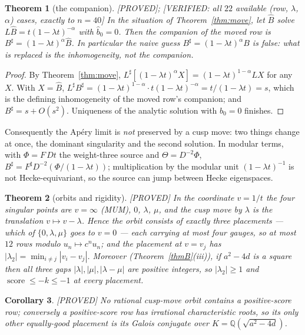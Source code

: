 \documentclass[11pt,reqno]{amsart}
\theoremstyle{plain}
\newtheorem{theorem}{Theorem}[section]
\newtheorem{corollary}[theorem]{Corollary}
\theoremstyle{definition}
\theoremstyle{remark}
\theoremstyle{plain}
\newcommand{\Q}{\mathbb{Q}}
\newcommand{\Proved}{\textup{\textsf{[PROVED]}}}
\newcommand{\VerifiedR}[1]{\textup{\textsf{[VERIFIED: #1]}}}
\begin{document}
\begin{theorem}[the companion]\label{thm:companion}
\Proved{}; \VerifiedR{all $22$ available (row, $\lambda$, $\alpha$) cases, exactly
to $n=40$} In the situation of Theorem~\ref{thm:move}, let $\widehat B$ solve
$L\widehat B=t(1-\lambda t)^{-\alpha}$ with $\widehat b_0=0$. Then the companion
of the moved row is $B^{\sharp}=(1-\lambda t)^{\alpha}\widehat B$. In particular
the naive guess $B^{\sharp}=(1-\lambda t)^{\alpha}B$ is \emph{false}: what is
replaced is the inhomogeneity, not the companion.
\end{theorem}

\begin{proof}
By Theorem~\ref{thm:move}, $L^{\sharp}[(1-\lambda t)^{\alpha}X]
=(1-\lambda t)^{1-\alpha}LX$ for any $X$. With $X=\widehat B$,
$L^{\sharp}B^{\sharp}=(1-\lambda t)^{1-\alpha}\cdot t(1-\lambda t)^{-\alpha}
=t/(1-\lambda t)=s$, which is the defining inhomogeneity of the moved row's
companion; and $B^\sharp=s+O(s^2)$. Uniqueness of the analytic solution with
$b_0=0$ finishes.
\end{proof}

Consequently the Ap\'ery limit is \emph{not} preserved by a cusp move: two
things change at once, the dominant singularity and the second solution. In
modular terms, with $\Phi=F\,Dt$ the weight-three source and
$\Theta=D^{-2}\Phi$, $B^\sharp=F^\sharp D^{-2}(\Phi/(1-\lambda t))$;
multiplication by the modular unit $(1-\lambda t)^{-1}$ is not Hecke-equivariant,
so the source can jump between Hecke eigenspaces.

\begin{theorem}[orbits and rigidity]\label{thm:orbits}
\Proved{} In the coordinate $v=1/t$ the four singular points are $v=\infty$
\textup{(}MUM\textup{)}, $0$, $\lambda$, $\mu$, and the cusp move by $\lambda$ is
the translation $v\mapsto v-\lambda$. Hence the orbit consists of exactly three
\emph{placements} --- which of $\{0,\lambda,\mu\}$ goes to $v=0$ --- each carrying
at most four gauges, so at most $12$ rows modulo $u_n\mapsto c^nu_n$; and the
placement at $v=v_j$ has $|\lambda_2|=\min_{i\ne j}|v_i-v_j|$. Moreover
\textup{(}Theorem~\ref{thmB}(iii)\textup{)}, if $a^2-4d$ is a square then all
three gaps $|\lambda|,|\mu|,|\lambda-\mu|$ are positive integers, so
$|\lambda_2|\ge1$ and $\operatorname{score}\le-k\le-1$ at every placement.
\end{theorem}

\begin{corollary}\label{cor:irrational-roots}
\Proved{} No rational cusp-move orbit contains a positive-score row; conversely a
positive-score row has irrational characteristic roots, so its only other
equally-good placement is its Galois conjugate over $K=\Q(\sqrt{a^2-4d})$.
\end{corollary}
\end{document}

